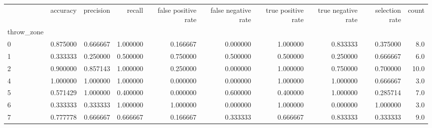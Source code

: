 \begin{tabular}{lrrrrrrrrr}
\toprule
{} &  accuracy &  precision &    recall &  false positive rate &  false negative rate &  true positive rate &  true negative rate &  selection rate &  count \\
throw\_zone &           &            &           &                      &                      &                     &                     &                 &        \\
\midrule
0          &  0.875000 &   0.666667 &  1.000000 &             0.166667 &             0.000000 &            1.000000 &            0.833333 &        0.375000 &    8.0 \\
1          &  0.333333 &   0.250000 &  0.500000 &             0.750000 &             0.500000 &            0.500000 &            0.250000 &        0.666667 &    6.0 \\
2          &  0.900000 &   0.857143 &  1.000000 &             0.250000 &             0.000000 &            1.000000 &            0.750000 &        0.700000 &   10.0 \\
4          &  1.000000 &   1.000000 &  1.000000 &             0.000000 &             0.000000 &            1.000000 &            1.000000 &        0.666667 &    3.0 \\
5          &  0.571429 &   1.000000 &  0.400000 &             0.000000 &             0.600000 &            0.400000 &            1.000000 &        0.285714 &    7.0 \\
6          &  0.333333 &   0.333333 &  1.000000 &             1.000000 &             0.000000 &            1.000000 &            0.000000 &        1.000000 &    3.0 \\
7          &  0.777778 &   0.666667 &  0.666667 &             0.166667 &             0.333333 &            0.666667 &            0.833333 &        0.333333 &    9.0 \\
\bottomrule
\end{tabular}
